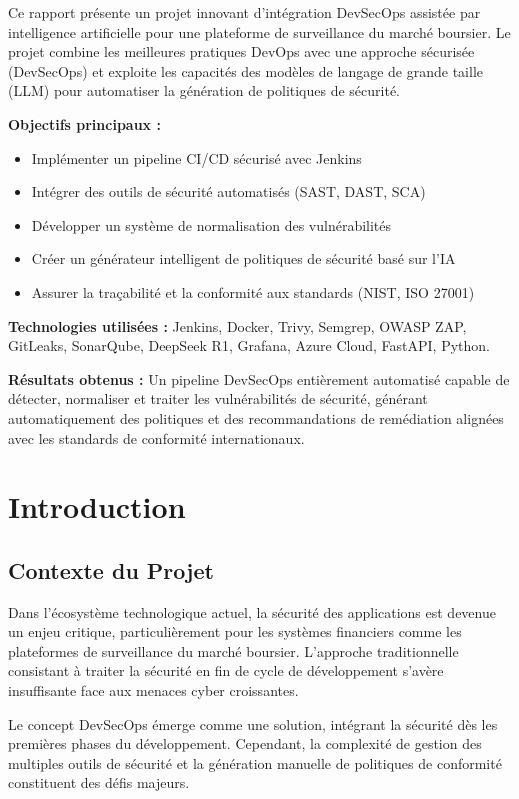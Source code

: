 \documentclass[12pt,a4paper]{report}
\begin{document}
Ce rapport présente un projet innovant d'intégration DevSecOps assistée par intelligence artificielle pour une plateforme de surveillance du marché boursier. Le projet combine les meilleures pratiques DevOps avec une approche sécurisée (DevSecOps) et exploite les capacités des modèles de langage de grande taille (LLM) pour automatiser la génération de politiques de sécurité.

\textbf{Objectifs principaux :}
\begin{itemize}
    \item Implémenter un pipeline CI/CD sécurisé avec Jenkins
    \item Intégrer des outils de sécurité automatisés (SAST, DAST, SCA)
    \item Développer un système de normalisation des vulnérabilités
    \item Créer un générateur intelligent de politiques de sécurité basé sur l'IA
    \item Assurer la traçabilité et la conformité aux standards (NIST, ISO 27001)
\end{itemize}

\textbf{Technologies utilisées :}
Jenkins, Docker, Trivy, Semgrep, OWASP ZAP, GitLeaks, SonarQube, DeepSeek R1, Grafana, Azure Cloud, FastAPI, Python.

\textbf{Résultats obtenus :}
Un pipeline DevSecOps entièrement automatisé capable de détecter, normaliser et traiter les vulnérabilités de sécurité, générant automatiquement des politiques et des recommandations de remédiation alignées avec les standards de conformité internationaux.

\newpage

\chapter{Introduction}

\section{Contexte du Projet}

Dans l'écosystème technologique actuel, la sécurité des applications est devenue un enjeu critique, particulièrement pour les systèmes financiers comme les plateformes de surveillance du marché boursier. L'approche traditionnelle consistant à traiter la sécurité en fin de cycle de développement s'avère insuffisante face aux menaces cyber croissantes.

Le concept DevSecOps émerge comme une solution, intégrant la sécurité dès les premières phases du développement. Cependant, la complexité de gestion des multiples outils de sécurité et la génération manuelle de politiques de conformité constituent des défis majeurs.
\end{document}

